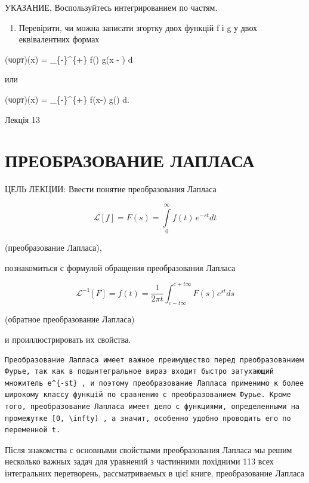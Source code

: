\documentclass[
  ukrainian,
]{article}
\providecommand{\tightlist}{%
  \setlength{\itemsep}{0pt}\setlength{\parskip}{0pt}}
\begin{document}
УКАЗАНИЕ, Воспользуйтесь интегрированием по частям.

\begin{enumerate}
\def\labelenumi{\arabic{enumi}.}
\setcounter{enumi}{4}
\tightlist
\item
  Перевірити, чи можна записати згортку двох функцій f і g у двох
  еквівалентних формах
\end{enumerate}

(чорт)(x) =  \int\_\{-\infty\}\^{}\{+\infty\}
f(\xi) g(x - \xi) d\xi

или

(чорт)(x) =  \int\_\{-\infty\}\^{}\{+\infty\}
f(x-\xi) g(\xi) d\xi.

Лекція 13

\section{ПРЕОБРАЗОВАНИЕ
ЛАПЛАСА}\label{ux43fux440ux435ux43eux431ux440ux430ux437ux43eux432ux430ux43dux438ux435-ux43bux430ux43fux43bux430ux441ux430}

ЦЕЛЬ ЛЕКЦИИ: Ввести понятие преобразования Лапласа

\[
\mathscr{L}[f] = F(s) = \int\limits_0^\infty f(t)\,e^{-st}dt
\]

(преобразование Лапласа),

познакомиться с формулой обращения преобразования Лапласа

\[
\mathscr{L}^{-1}[F] = f(t) = \frac{1}{2\pi t} \int_{c-t\infty}^{c+t\infty} F(s) e^{st} ds
\]

(обратное преобразование Лапласа)

и проиллюстрировать их свойства.

\begin{verbatim}
Преобразование Лапласа имеет важное преимущество перед преобразованием Фурье, так как в подынтегральное вираз входит быстро затухающий множитель e^{-st} , и поэтому преобразование Лапласа применимо к более широкому классу функцій по сравнению с преобразованием Фурье. Кроме того, преобразование Лапласа имеет дело с функциями, определенными на промежутке [0, \infty) , а значит, особенно удобно проводить его по переменной t.
\end{verbatim}

Після знакомства с основными свойствами преобразования Лапласа мы решим
несколько важных задач для уравнений з частинними похідними 113 всех
інтегральних перетворень, рассматриваемых в цієї книге, преобразование
Лапласа
\end{document}

